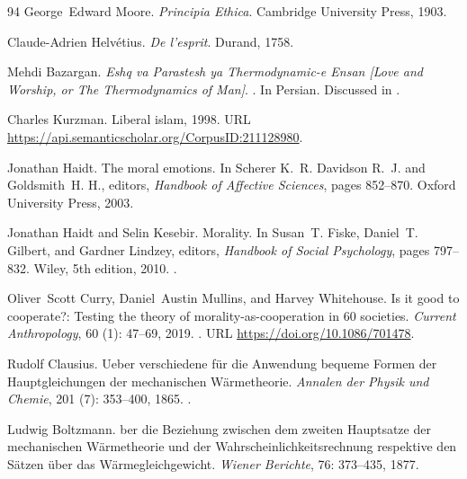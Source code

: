 \documentclass[11pt]{article}
\theoremstyle{plain}
\theoremstyle{definition}
\theoremstyle{remark}
\begin{document}
\begin{thebibliography}{94}
George~Edward Moore.
\newblock \emph{Principia Ethica}.
\newblock Cambridge University Press, 1903.

Claude-Adrien Helv{\'e}tius.
\newblock \emph{De l'esprit}.
\newblock Durand, 1758.

Mehdi Bazargan.
\newblock \emph{Eshq va Parastesh ya Thermodynamic-e Ensan [Love and Worship,
  or The Thermodynamics of Man]}.
.
\newblock In Persian. Discussed in \cite{Kurzman1998}.

Charles Kurzman.
\newblock Liberal islam, 1998.
\newblock URL \url{https://api.semanticscholar.org/CorpusID:211128980}.

Jonathan Haidt.
\newblock The moral emotions.
\newblock In Scherer K.~R. Davidson R.~J. and Goldsmith~H. H., editors,
  \emph{Handbook of Affective Sciences}, pages 852--870. Oxford University
  Press, 2003.

Jonathan Haidt and Selin Kesebir.
\newblock Morality.
\newblock In Susan~T. Fiske, Daniel~T. Gilbert, and Gardner Lindzey, editors,
  \emph{Handbook of Social Psychology}, pages 797--832. Wiley, 5th edition,
  2010.
\newblock {}.

Oliver~Scott Curry, Daniel~Austin Mullins, and Harvey Whitehouse.
\newblock Is it good to cooperate?: Testing the theory of
  morality-as-cooperation in 60 societies.
\newblock \emph{Current Anthropology}, 60 (1): 47--69, 2019.
\newblock {}.
\newblock URL \url{https://doi.org/10.1086/701478}.

Rudolf Clausius.
\newblock Ueber verschiedene f{\"u}r die {Anwendung} bequeme {Formen} der
  {Hauptgleichungen} der mechanischen {W{\"a}rmetheorie}.
\newblock \emph{Annalen der Physik und Chemie}, 201 (7):
  353--400, 1865.
\newblock {}.

Ludwig Boltzmann.
ber die {Beziehung} zwischen dem zweiten {Hauptsatze} der
  mechanischen {W{\"a}rmetheorie} und der {Wahrscheinlichkeitsrechnung}
  respektive den {S{\"a}tzen} {\"u}ber das {W{\"a}rmegleichgewicht}.
\newblock \emph{Wiener Berichte}, 76: 373--435, 1877.


\end{thebibliography}
\end{document}
